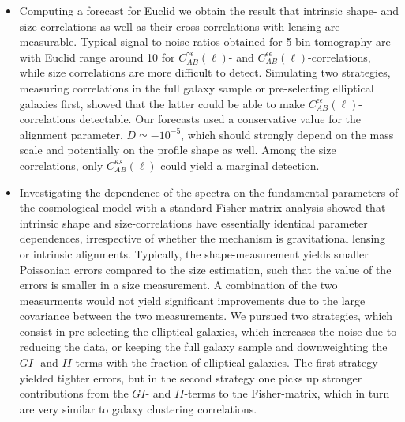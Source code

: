 \documentclass[a4paper,fleqn,usenatbib]{mnras}
\begin{document}
\begin{itemize}
\item{Computing a forecast for Euclid we obtain the result that intrinsic shape- and size-correlations as well as their cross-correlations with lensing are measurable. Typical signal to noise-ratios obtained for 5-bin tomography are with Euclid range around 10 for $C^{\gamma\epsilon}_{AB}(\ell)$- and $C^{\epsilon\epsilon}_{AB}(\ell)$-correlations, while size correlations are more difficult to detect. Simulating two strategies, measuring correlations in the full galaxy sample or pre-selecting elliptical galaxies first, showed that the latter could be able to make $C^{\epsilon\epsilon}_{AB}(\ell)$-correlations detectable. Our forecasts used a conservative value for the alignment parameter, $D\simeq -10^{-5}$, which should strongly depend on the mass scale \citep{piras_mass_2018} and potentially on the profile shape as well. Among the size correlations, only $C^{\kappa s}_{AB}(\ell)$ could yield a marginal detection.}

\item{Investigating the dependence of the spectra on the fundamental parameters of the cosmological model with a standard Fisher-matrix analysis showed that intrinsic shape and size-correlations have essentially identical parameter dependences, irrespective of whether the mechanism is gravitational lensing or intrinsic alignments. Typically, the shape-measurement yields smaller Poissonian errors compared to the size estimation, such that the value of the errors is smaller in a size measurement. A combination of the two measurments would not yield significant improvements due to the large covariance between the two measurements. We pursued two strategies, which consist in pre-selecting the elliptical galaxies, which increases the noise due to reducing the data, or keeping the full galaxy sample and downweighting the $GI$- and $II$-terms with the fraction of elliptical galaxies. The first strategy yielded tighter errors, but in the second strategy one picks up stronger contributions from the $GI$- and $II$-terms to the Fisher-matrix, which in turn are very similar to galaxy clustering correlations.}

\end{itemize}
\end{document}
